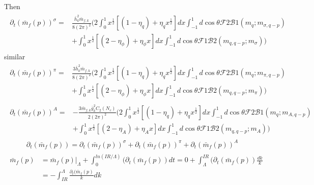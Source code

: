 \documentclass[12pt]{article}
\begin{document}
Then
\begin{eqnarray}
\begin{split}
\partial_t (\bar m_f(p))^\sigma=&\frac{\bar h_k^2 \bar m_{f,k}}{8 (2 \pi)^2}\bigg (2 \int_{0}^{1}  x^{\frac{1}{2}}[(1-\eta_q)+\eta_q x^{\frac{1}{2}}] dx \int_{-1}^{1} d \cos \theta \mathcal{F}2\mathcal{B}1(m_q;m_{\sigma,q-p})\\
&+\int_0^1 x^{\frac{1}{2}}[(2-\eta_\phi)+\eta_\phi x] dx\int_{-1}^{1} d\cos \theta \mathcal{F}1\mathcal{B}2(m_{q,q-p};m_{\sigma}) \bigg )
\end{split}
\end{eqnarray}
similar
\begin{eqnarray}
\begin{split}
\partial_t (\bar m_f(p))^\pi=&\frac{3\bar h_k^2 \bar m_{f,k}}{8 (2 \pi)^2}\bigg (2 \int_{0}^{1}  x^{\frac{1}{2}}[(1-\eta_q)+\eta_q x^{\frac{1}{2}}] dx \int_{-1}^{1} d \cos \theta \mathcal{F}2\mathcal{B}1(m_q;m_{\pi,q-p})\\
&+\int_0^1 x^{\frac{1}{2}}[(2-\eta_\phi)+\eta_\phi x] dx\int_{-1}^{1} d\cos \theta \mathcal{F}1\mathcal{B}2(m_{q,q-p};m_{\pi}) \bigg )
\end{split}
\end{eqnarray}
\begin{eqnarray}
\begin{split}
\partial_t (\bar m_f(p))^A=&-\frac{3\bar m_{f,k} \bar{g}^2_kC_2(N_c)}{2 (2 \pi)^2}\bigg (2 \int_{0}^{1}  x^{\frac{1}{2}}[(1-\eta_q)+\eta_q x^{\frac{1}{2}}] dx \int_{-1}^{1} d \cos \theta \mathcal{F}2\mathcal{B}1(m_q;m_{A,q-p})\\
&+\int_0^1 x^{\frac{1}{2}}[(2-\eta_A)+\eta_A x] dx\int_{-1}^{1} d\cos \theta \mathcal{F}1\mathcal{B}2(m_{q,q-p};m_{A}) \bigg )
\end{split}
\end{eqnarray}
\begin{eqnarray}
\partial_t (\bar m_f(p))=\partial_t (\bar m_f(p))^\sigma+\partial_t (\bar m_f(p))^\pi+\partial_t (\bar m_f(p))^A
\end{eqnarray}
\begin{eqnarray}
\begin{split}
\bar m_f(p)&=\bar m_f(p)\Big|_\Lambda+\int_0^{ln(IR/\Lambda)}(\partial_t (\bar m_f(p)) dt=0+\int_\Lambda^{IR}(\partial_t (\bar m_f(p)) \frac{dk}{k}\\
&=-\int_{IR}^{\Lambda}\frac{\partial_t (\bar m_f(p)} {k}dk
\end{split}
\end{eqnarray}
\end{document}
